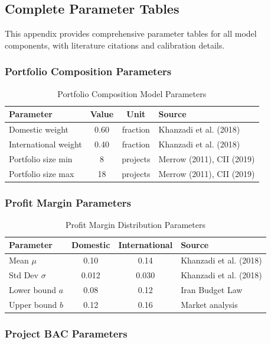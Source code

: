 \subsection{Complete Parameter Tables}

This appendix provides comprehensive parameter tables for all model components, with literature citations and calibration details.

\subsubsection{Portfolio Composition Parameters}

\begin{table}[h]
\centering
\caption{Portfolio Composition Model Parameters}
\begin{tabular}{lccl}
\toprule
Parameter & Value & Unit & Source \\
\midrule
Domestic weight & 0.60 & fraction & Khanzadi et al. (2018) \\
International weight & 0.40 & fraction & Khanzadi et al. (2018) \\
Portfolio size min & 8 & projects & Merrow (2011), CII (2019) \\
Portfolio size max & 18 & projects & Merrow (2011), CII (2019) \\
\bottomrule
\end{tabular}
\end{table}

\subsubsection{Profit Margin Parameters}

\begin{table}[h]
\centering
\caption{Profit Margin Distribution Parameters}
\begin{tabular}{lccl}
\toprule
Parameter & Domestic & International & Source \\
\midrule
Mean $\mu$ & 0.10 & 0.14 & Khanzadi et al. (2018) \\
Std Dev $\sigma$ & 0.012 & 0.030 & Khanzadi et al. (2018) \\
Lower bound $a$ & 0.08 & 0.12 & Iran Budget Law \\
Upper bound $b$ & 0.12 & 0.16 & Market analysis \\
\bottomrule
\end{tabular}
\end{table}

\subsubsection{Project BAC Parameters}

